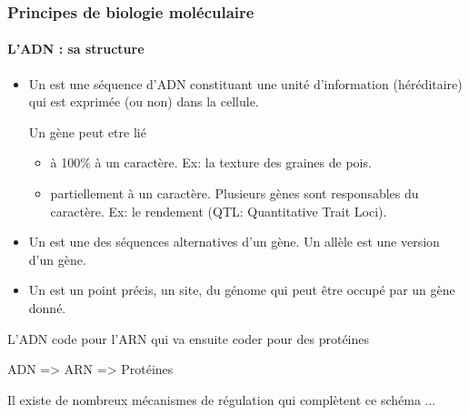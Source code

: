 \begin{frame}
\frametitle{Principes de biologie moléculaire}
\framesubtitle{L'ADN : sa structure}

\begin{itemize}
\item Un  est une séquence d'ADN constituant une unité d'information (héréditaire) qui est exprimée (ou non) dans la cellule. 

Un gène peut etre lié 
\begin{itemize}
\item à 100\% à un caractère. Ex: la texture des graines de pois.
\item partiellement à un caractère. Plusieurs gènes sont responsables du caractère. Ex: le rendement (QTL: Quantitative Trait Loci).
\end{itemize}


\item Un  est une des séquences alternatives d'un gène. Un allèle est une version d’un gène.

\item Un  est un point précis, un site, du génome qui peut être occupé par un gène donné.

\end{itemize}

L'ADN code pour l'ARN qui va ensuite coder pour des protéines

\begin{center}
ADN => ARN => Protéines
\end{center}

Il existe de nombreux mécanismes de régulation qui complètent ce schéma ...

\end{frame}


